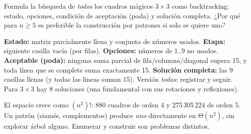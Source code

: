 \begin{prob}
Formula la búsqueda de \emph{todos} los cuadros mágicos $3\times3$ como backtracking: estado, opciones, condición de aceptación (poda) y solución completa. ¿Por qué para $n\ge5$ es preferible la construcción por patrones si solo se quiere uno?
\end{prob}
\begin{sol}
\textbf{Estado:} matriz parcialmente llena y conjunto de números usados. \textbf{Etapa:} siguiente casilla vacía (por filas). \textbf{Opciones:} números de $1..9$ no usados. \textbf{Aceptable (poda):} ninguna suma parcial de fila/columna/diagonal supera 15, y toda línea que se complete suma exactamente 15. \textbf{Solución completa:} las 9 casillas llenas (y todas las líneas suman 15). Versión \emph{todas}: registrar y seguir. Para $3\times3$ hay 8 soluciones (una fundamental con sus rotaciones y reflexiones).

El espacio crece como $(n^2)!$: 880 cuadros de orden 4 y 275\,305\,224 de orden 5. Un patrón (siamés, complementos) produce \emph{uno} directamente en $\Theta(n^2)$, sin explorar árbol alguno. Enumerar y construir son problemas distintos.
\end{sol}
